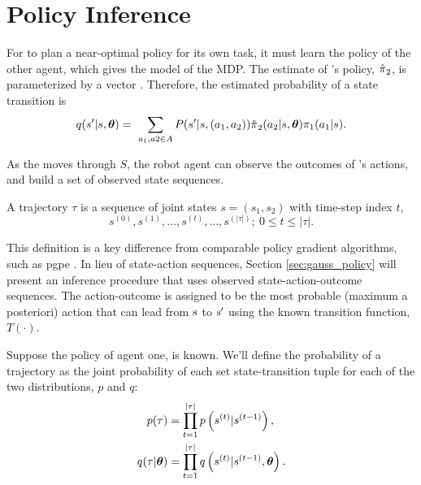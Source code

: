 \section{Policy Inference}\label{sec:policy_obj}

    For  to plan a near-optimal policy for its own task, it must learn the policy of the other agent, which
    gives the model of the MDP. The estimate of 's policy, $\hat{\pi_{}}_2$, is parameterized by a
    vector \vect{\theta}.  Therefore, the estimated probability of a state transition is
    \begin{equation}\label{eq:est_state_trans_prob}
        q(s'|s, \boldsymbol{\mathbb{\theta}}) = \
            \sum_{a_1, a2 \in A}P(s'|s,(a_1,a_2))\hat{\pi_{}}_2(a_2|s,\boldsymbol{\mathbb{\theta}})\pi_{1}(a_1|s).
    \end{equation}

    As the  moves through $S$, the robot agent can observe the outcomes of 's actions, and build a set
    of observed state sequences.
    \begin{definition}\label{def:traj}
        A trajectory $\tau$ is a sequence of joint states $s=(s_1, s_2)$ with time-step index $t$,
        \[
        s^{(0)}, s^{(1)}, \ldots , s^{(t)}, \ldots , s^{(|\tau|)};\ 0 \leq t \leq |\tau|.
        \]
    \end{definition}

    \begin{remark}
        This definition is a key difference from comparable policy gradient algorithms, such as \ac{pgpe}
        \cite{tangkaratt2014model} \cite{sehnke2010parameter}. In lieu of state-action sequences, Section
        \ref{sec:gauss_policy} will present an inference procedure that uses observed state-\textnormal{action-outcome}
        sequences. The action-outcome is assigned to be the most probable \textnormal{(maximum a posteriori)} action
        that can lead from $\textnormal{s}$ to $\textnormal{s}'$ using the known transition function, $T(\cdot)$.
    \end{remark}

    Suppose the policy of agent one,  is known. We'll define the probability of a trajectory as the joint
    probability of each set state-transition tuple for each of the two distributions, $p$ and $q$:
    \begin{align*}
        p(\tau) &= \prod_{t=1}^{|\tau|}p\left( s^{(t)}| s^{(t-1)} \right), \\
        q(\tau|\boldsymbol{\mathbb{\theta}}) &= \prod_{t=1}^{|\tau|}q\left(s^{(t)}| s^{(t-1)}, \boldsymbol{\mathbb{\theta}}\right).
    \end{align*}

